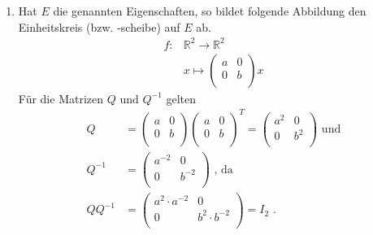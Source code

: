 \documentclass[a4paper]{scrartcl}
\begin{document}
\begin{enumerate}[label=\bfseries\arabic*.]
\begin{enumerate}
            \item
                Hat $E$ die genannten Eigenschaften, so bildet folgende
                Abbildung den Einheitskreis (bzw. -scheibe) auf $E$ ab.
                \begin{equation}
                    \begin{split}
                        f \colon& \mathbb{R}^2 \to \mathbb{R}^2 \\
                        & x \mapsto 
                        \begin{pmatrix}
                            a & 0 \\
                            0 & b \\
                        \end{pmatrix}
                        x
                    \end{split}
                \end{equation}
                Für die Matrizen $Q$ und $Q^{-1}$ gelten
                \begin{align}
                    Q &=
                    \begin{pmatrix}
                        a & 0 \\
                        0 & b \\
                    \end{pmatrix}
                    \begin{pmatrix}
                        a & 0 \\
                        0 & b \\
                    \end{pmatrix}^T
                    =
                    \begin{pmatrix}
                        a^2 & 0   \\
                        0   & b^2 \\
                    \end{pmatrix} \text{ und} \\
                    Q^{-1} &=
                    \begin{pmatrix}
                        a^{-2} & 0      \\
                        0      & b^{-2} \\
                    \end{pmatrix} \text{ , da} \\
                    QQ^{-1} &=
                    \begin{pmatrix}
                        a^2 \cdot a^{-2} & 0 \\
                        0 & b^2 \cdot b^{-2} \\
                    \end{pmatrix}
                    = I_2 \text{ .}
                \end{align}


\end{enumerate}
\end{enumerate}
\end{document}
